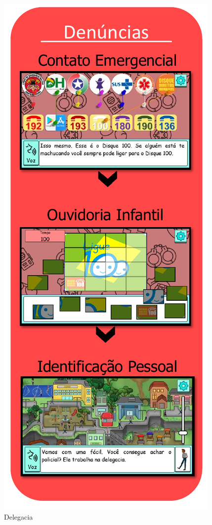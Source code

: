 \begin{figure}%
  \vspace{-20pt}
  \caption{\label{fig:DelegaciaDP}Delegacia}
  \includegraphics[width=\linewidth]{./Visuais/Delegacia2.pdf}
  \vspace{-1.0cm}
\end{figure}


